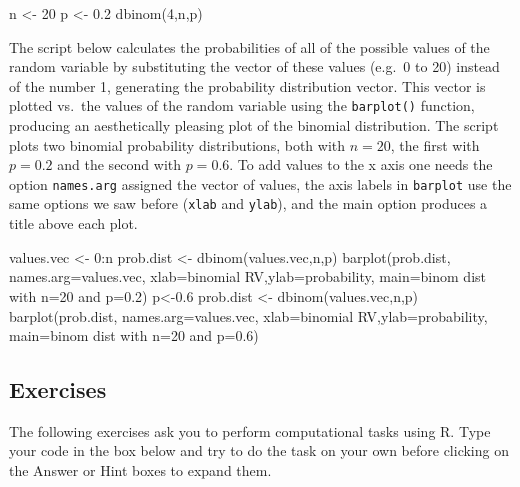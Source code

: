 \documentclass[
  letterpaper,
  DIV=11,
  numbers=noendperiod]{scrreprt}
\newenvironment{Shaded}{\begin{snugshade}}{\end{snugshade}}
\newcommand{\NormalTok}[1]{\textcolor[rgb]{0.00,0.23,0.31}{#1}}
\begin{document}
\begin{Shaded}
\begin{Highlighting}[]
\NormalTok{n \textless{}{-} 20}
\NormalTok{p \textless{}{-} 0.2}
\NormalTok{dbinom(4,n,p)}
\end{Highlighting}
\end{Shaded}

The script below calculates the probabilities of all of the possible
values of the random variable by substituting the vector of these values
(e.g.~0 to 20) instead of the number 1, generating the probability
distribution vector. This vector is plotted vs.~the values of the random
variable using the \texttt{barplot()} function, producing an
aesthetically pleasing plot of the binomial distribution. The script
plots two binomial probability distributions, both with \(n=20\), the
first with \(p=0.2\) and the second with \(p=0.6\). To add values to the
x axis one needs the option \texttt{names.arg} assigned the vector of
values, the axis labels in \texttt{barplot} use the same options we saw
before (\texttt{xlab} and \texttt{ylab}), and the main option produces a
title above each plot.

\begin{Shaded}
\begin{Highlighting}[]
\NormalTok{values.vec \textless{}{-} 0:n}
\NormalTok{prob.dist \textless{}{-} dbinom(values.vec,n,p)}
\NormalTok{barplot(prob.dist, names.arg=values.vec, xlab=\textquotesingle{}binomial RV\textquotesingle{},ylab=\textquotesingle{}probability\textquotesingle{},}
\NormalTok{main=\textquotesingle{}binom dist with n=20 and p=0.2\textquotesingle{})}
\NormalTok{p\textless{}{-}0.6}
\NormalTok{prob.dist \textless{}{-} dbinom(values.vec,n,p)}
\NormalTok{barplot(prob.dist, names.arg=values.vec, xlab=\textquotesingle{}binomial RV\textquotesingle{},ylab=\textquotesingle{}probability\textquotesingle{},}
\NormalTok{main=\textquotesingle{}binom dist with n=20 and p=0.6\textquotesingle{})}
\end{Highlighting}
\end{Shaded}

\hypertarget{exercises-25}{%
\subsection*{Exercises}\label{exercises-25}}

The following exercises ask you to perform computational tasks using R.
Type your code in the box below and try to do the task on your own
before clicking on the Answer or Hint boxes to expand them.
\end{document}
